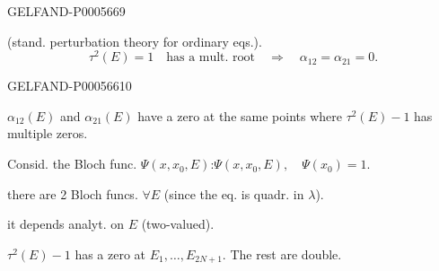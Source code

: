 \begin{GelfandAdjacentEvidence}{GELFAND-P000566}{9}

(stand. perturbation theory for ordinary eqs.).
\[
\tau^2(E)=1\quad\text{has a mult. root}\quad\Rightarrow\quad\alpha_{12}=\alpha_{21}=0.
\]
\end{GelfandAdjacentEvidence}
\begin{GelfandAdjacentEvidence}{GELFAND-P000566}{10}

\(\alpha_{12}(E)\) and \(\alpha_{21}(E)\) have a zero at the same points where \(\tau^2(E)-1\) has multiple zeros.

Consid. the Bloch func. \(\Psi(x,x_0,E)\):\qquad \(\Psi(x,x_0,E),\quad\Psi(x_0)=1.\)

there are 2 Bloch funcs. \(\forall E\) (since the eq. is quadr. in \(\lambda\)).

it depends analyt. on \(E\) (two-valued).
\end{GelfandAdjacentEvidence}

\(\tau^2(E)-1\) has a zero at \(E_1,\ldots,E_{2N+1}\). The rest are double.


